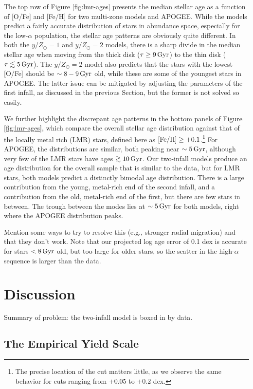 \documentclass[twocolumn,twocolappendix,linenumbers]{aastex631}
\newcommand{\todo}[1]{{\color{red}#1}}
\newcommand{\mathFeH}{{\rm [Fe/H]}}
\newcommand{\yZ}[1]{$y/Z_\odot=#1$}
\newcommand{\Gyr}{\,{\rm Gyr}}
\begin{document}
The top row of Figure \ref{fig:lmr-ages} presents the median stellar age as a function of [O/Fe] and [Fe/H] for two multi-zone models and APOGEE. While the models predict a fairly accurate distribution of stars in abundance space, especially for the low-$\alpha$ population, the stellar age patterns are obviously quite different. In both the \yZ{1} and \yZ{2} models, there is a sharp divide in the median stellar age when moving from the thick disk ($\tau\ge9\Gyr$) to the thin disk ($\tau\lesssim5\Gyr$). The \yZ{2} model also predicts that the stars with the lowest [O/Fe] should be $\sim8-9\Gyr$ old, while these are some of the youngest stars in APOGEE. The latter issue can be mitigated by adjusting the parameters of the first infall, as discussed in the previous Section, but the former is not solved so easily.

We further highlight the discrepant age patterns in the bottom panels of Figure \ref{fig:lmr-ages}, which compare the overall stellar age distribution against that of the locally metal rich (LMR) stars, defined here as $\mathFeH\ge+0.1$.\footnote{The precise location of the cut matters little, as we observe the same behavior for cuts ranging from $+0.05$ to $+0.2$ dex.} For APOGEE, the distributions are similar, both peaking near $\sim5\Gyr$, although very few of the LMR stars have ages $\gtrsim10\Gyr$. Our two-infall models produce an age distribution for the overall sample that is similar to the data, but for LMR stars, both models predict a distinctly bimodal age distribution. There is a large contribution from the young, metal-rich end of the second infall, and a contribution from the old, metal-rich end of the first, but there are few stars in between. The trough between the modes lies at $\sim5\Gyr$ for both models, right where the APOGEE distribution peaks.

\todo{Mention some ways to try to resolve this (e.g., stronger radial migration) and that they don't work.}
\todo{Note that our projected log age error of 0.1 dex is accurate for stars $<8\Gyr$ old, but too large for older stars, so the scatter in the high-$\alpha$ sequence is larger than the data.}

\section{Discussion}
\label{sec:discussion}

\todo{Summary of problem: the two-infall model is boxed in by data.}

\subsection{The Empirical Yield Scale}
\end{document}
